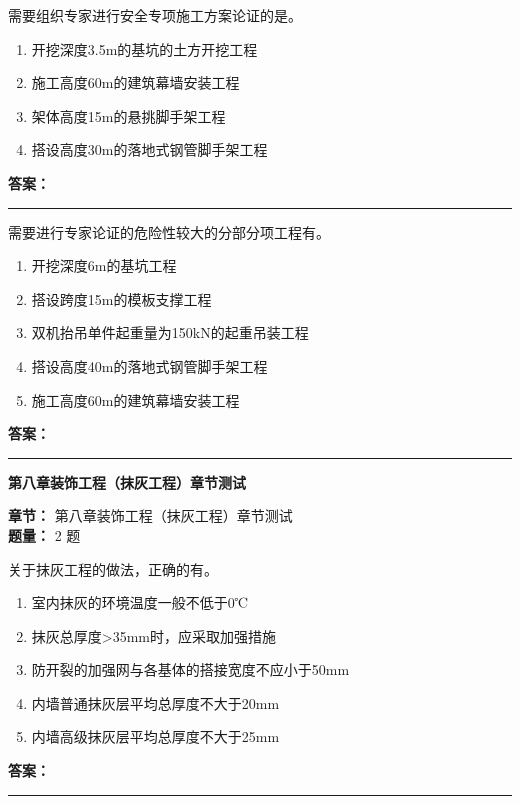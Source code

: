 \documentclass[UTF8,fontset=fandol,11pt]{ctexart}
\newcommand{\chaptertitle}[1]{\vspace{0.5em}\begin{tcolorbox}[enhanced,colback=deepblue,colframe=deepblue,arc=2mm,boxrule=0pt]\begin{center}\Large\bfseries\color{white}#1\end{center}\end{tcolorbox}\vspace{0.5em}}
\newcommand{\answerline}{\textcolor{answerred}{\rule{2.4cm}{0.7pt}}}
\begin{document}
\vspace{0.2em}

\begin{quizbox}[title={第 9 题}]
需要组织专家进行安全专项施工方案论证的是。\\
\begin{enumerate}[label=\Alph*.]
\item 开挖深度3.5m的基坑的土方开挖工程
\item 施工高度60m的建筑幕墙安装工程
\item 架体高度15m的悬挑脚手架工程
\item 搭设高度30m的落地式钢管脚手架工程
\end{enumerate}
\textbf{\textcolor{answerred}{答案：}} \answerline
\end{quizbox}

\vspace{0.2em}

\begin{quizbox}[title={第 10 题}]
需要进行专家论证的危险性较大的分部分项工程有。\\
\begin{enumerate}[label=\Alph*.]
\item 开挖深度6m的基坑工程
\item 搭设跨度15m的模板支撑工程
\item 双机抬吊单件起重量为150kN的起重吊装工程
\item 搭设高度40m的落地式钢管脚手架工程
\item 施工高度60m的建筑幕墙安装工程
\end{enumerate}
\textbf{\textcolor{answerred}{答案：}} \answerline
\end{quizbox}

\vspace{0.2em}

\chaptertitle{第八章装饰工程（抹灰工程）章节测试}
\begin{mainbox}
\textbf{\textcolor{mainblue}{章节：}} 第八章装饰工程（抹灰工程）章节测试\\
\textbf{\textcolor{answerred}{题量：}} 2 题
\end{mainbox}

\begin{quizbox}[title={第 1 题}]
关于抹灰工程的做法，正确的有。\\
\begin{enumerate}[label=\Alph*.]
\item 室内抹灰的环境温度一般不低于0℃
\item 抹灰总厚度>35mm时，应采取加强措施
\item 防开裂的加强网与各基体的搭接宽度不应小于50mm
\item 内墙普通抹灰层平均总厚度不大于20mm
\item 内墙高级抹灰层平均总厚度不大于25mm
\end{enumerate}
\textbf{\textcolor{answerred}{答案：}} \answerline
\end{quizbox}
\end{document}
